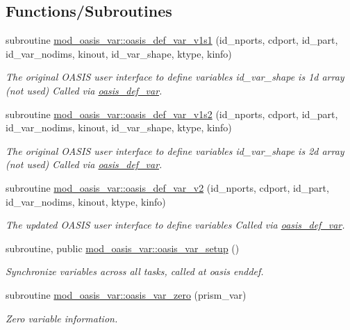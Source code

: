 \subsection*{Functions/\+Subroutines}
\begin{DoxyCompactItemize}
\item 
subroutine \hyperlink{namespacemod__oasis__var_ab28530889758da2183e09f345c0993f1}{mod\+\_\+oasis\+\_\+var\+::oasis\+\_\+def\+\_\+var\+\_\+v1s1} (id\+\_\+nports, cdport, id\+\_\+part, id\+\_\+var\+\_\+nodims, kinout, id\+\_\+var\+\_\+shape, ktype, kinfo)
\begin{DoxyCompactList}\small\item\em The original O\+A\+S\+IS user interface to define variables id\+\_\+var\+\_\+shape is 1d array (not used) Called via \hyperlink{interfacemod__oasis__var_1_1oasis__def__var}{oasis\+\_\+def\+\_\+var}. \end{DoxyCompactList}\item 
subroutine \hyperlink{namespacemod__oasis__var_a63fa94287280b746e4fc7b811f377ceb}{mod\+\_\+oasis\+\_\+var\+::oasis\+\_\+def\+\_\+var\+\_\+v1s2} (id\+\_\+nports, cdport, id\+\_\+part, id\+\_\+var\+\_\+nodims, kinout, id\+\_\+var\+\_\+shape, ktype, kinfo)
\begin{DoxyCompactList}\small\item\em The original O\+A\+S\+IS user interface to define variables id\+\_\+var\+\_\+shape is 2d array (not used) Called via \hyperlink{interfacemod__oasis__var_1_1oasis__def__var}{oasis\+\_\+def\+\_\+var}. \end{DoxyCompactList}\item 
subroutine \hyperlink{namespacemod__oasis__var_a1d95fff92118dedf036d117a8b8e856f}{mod\+\_\+oasis\+\_\+var\+::oasis\+\_\+def\+\_\+var\+\_\+v2} (id\+\_\+nports, cdport, id\+\_\+part, id\+\_\+var\+\_\+nodims, kinout, ktype, kinfo)
\begin{DoxyCompactList}\small\item\em The updated O\+A\+S\+IS user interface to define variables Called via \hyperlink{interfacemod__oasis__var_1_1oasis__def__var}{oasis\+\_\+def\+\_\+var}. \end{DoxyCompactList}\item 
subroutine, public \hyperlink{namespacemod__oasis__var_ab33b7fbec62bcfd15e9cd7f912f71035}{mod\+\_\+oasis\+\_\+var\+::oasis\+\_\+var\+\_\+setup} ()
\begin{DoxyCompactList}\small\item\em Synchronize variables across all tasks, called at oasis enddef. \end{DoxyCompactList}\item 
subroutine \hyperlink{namespacemod__oasis__var_aa780f62e9eded0a55d0077a990bf2443}{mod\+\_\+oasis\+\_\+var\+::oasis\+\_\+var\+\_\+zero} (prism\+\_\+var)
\begin{DoxyCompactList}\small\item\em Zero variable information. \end{DoxyCompactList}\end{DoxyCompactItemize}
